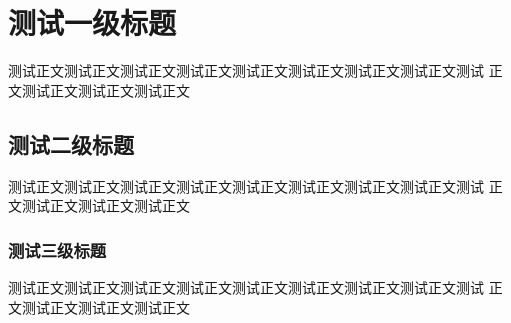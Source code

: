 \documentclass[UTF8, zihao = -4, linespread = 1.335, heading = true, fontset = none]{ctexart}
\begin{document}





\transbody
\setfancylength
\pagestyle{ujntranslation}


\section{测试一级标题}
测试正文测试正文测试正文测试正文测试正文测试正文测试正文测试正文测试
正文测试正文测试正文测试正文
\subsection{测试二级标题}
测试正文测试正文测试正文测试正文测试正文测试正文测试正文测试正文测试
正文测试正文测试正文测试正文
\subsubsection{测试三级标题}
测试正文测试正文测试正文测试正文测试正文测试正文测试正文测试正文测试
正文测试正文测试正文测试正文

\end{document}

